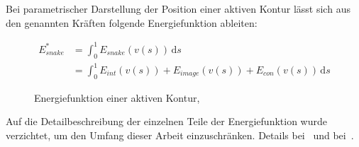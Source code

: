 Bei parametrischer Darstellung der Position einer aktiven Kontur lässt sich aus den genannten Kräften folgende Energiefunktion ableiten:

\begin{figure}[H]
    \begin{align}
        E_{snake}^* & = \int_0^1 E_{snake}(v(s))\, \mathrm{d}s\\
         & = \int_0^1 E_{int}(v(s)) + E_{image}(v(s)) + E_{con}(v(s))\, \mathrm{d}s
    \end{align}
    \caption{Energiefunktion einer aktiven Kontur,~\cite{kass88snakes:active}}
\end{figure}

Auf die Detailbeschreibung der einzelnen Teile der Energiefunktion wurde verzichtet, um den Umfang dieser Arbeit einzuschränken. Details bei~\citet[S. 247]{hudritsch:script:cp} und bei~\citet[S. 323 bis 328]{kass88snakes:active}.  %
